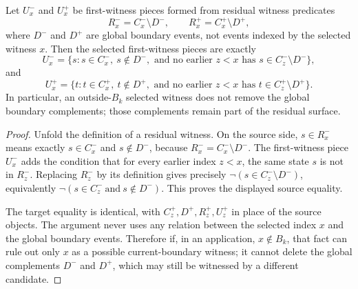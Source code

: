 \begin{helper}
Let \(U^-_x\) and \(U^+_x\) be first-witness pieces formed from residual
witness predicates
\[
R^-_x=C^-_x\setminus D^-,
\qquad
R^+_x=C^+_x\setminus D^+,
\]
where \(D^-\) and \(D^+\) are global boundary events, not events indexed by
the selected witness \(x\).  Then the selected first-witness pieces are
exactly
\[
U^-_x=\{s:s\in C^-_x,\ s\notin D^-,\text{ and no earlier }z<x
\text{ has }s\in C^-_z\setminus D^-\},
\]
and
\[
U^+_x=\{t:t\in C^+_x,\ t\notin D^+,\text{ and no earlier }z<x
\text{ has }t\in C^+_z\setminus D^+\}.
\]
In particular, an outside-\(B_k\) selected witness does not remove the global
boundary complements; those complements remain part of the residual surface.
\end{helper}
\begin{proof}
Unfold the definition of a residual witness.  On the source side,
\(s\in R^-_x\) means exactly \(s\in C^-_x\) and \(s\notin D^-\), because
\(R^-_x=C^-_x\setminus D^-\).  The first-witness piece \(U^-_x\) adds the
condition that for every earlier index \(z<x\), the same state \(s\) is not
in \(R^-_z\).  Replacing \(R^-_z\) by its definition gives precisely
\(\neg(s\in C^-_z\setminus D^-)\), equivalently
\(\neg(s\in C^-_z\ \text{and}\ s\notin D^-)\).  This proves the displayed
source equality.

The target equality is identical, with \(C^+_z,D^+,R^+_z,U^+_z\) in place of
the source objects.  The argument never uses any relation between the
selected index \(x\) and the global boundary events.  Therefore if, in an
application, \(x\notin B_k\), that fact can rule out only \(x\) as a possible
current-boundary witness; it cannot delete the global complements \(D^-\) and
\(D^+\), which may still be witnessed by a different candidate.
\end{proof}

